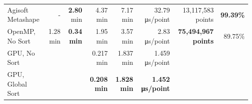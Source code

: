 \begin{table}
\begin{tabular}{l@{\hskip 0.25in}|rrr|r|r|r|r}
    Agisoft Metashape & - & \textbf{2.80} \si{\minute} & 4.37 \si{\minute} & 7.17 \si{\minute} & 32.79 \si{\micro\second}/point & 13,117,583 
     points & \textbf{99.39\%}\\
    \cmidrule{1-8}
    OpenMP, No Sort & \multirow{\numExperiments}{*}{1.28 \si{\minute}} & \multirow{\numExperiments}{*}{\textbf{0.34 \si{\minute}}} & 1.95 \si{\minute} & 3.57 \si{\minute} & 2.83 \si{\micro\second}/point & \multirow{\numExperiments}{*}{\textbf{75,494,967 points}} & \multirow{\numExperiments}{*}{89.75\%}\\
    GPU, No Sort & & & 0.217 \si{\minute} & 1.837 \si{\minute} & 1.459 \si{\micro\second}/point & &\\
    GPU, Global Sort & & & \textbf{0.208 \si{\minute}} & \textbf{1.828 \si{\minute}} & \textbf{1.452 \si{\micro\second}/point} & &\\
    \bottomrule
    \end{tabular}
\end{table}
\renewcommand{\arraystretch}{1}

